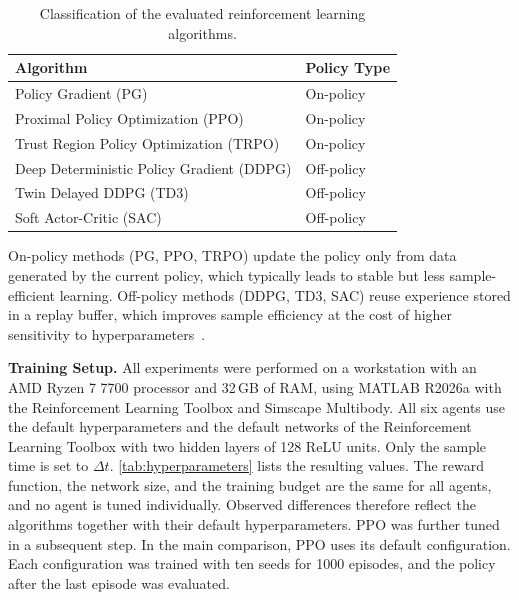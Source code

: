 \documentclass{ieeeaccess}
\begin{document}
\begin{table}[!t]
\centering
\caption{Classification of the evaluated reinforcement learning algorithms.}
\label{tab:on_off_policy}
\begin{tabular}{ll}
\toprule
\textbf{Algorithm} & \textbf{Policy Type} \\
\midrule
Policy Gradient (PG) & On-policy \\
Proximal Policy Optimization (PPO) & On-policy  \\
Trust Region Policy Optimization (TRPO) & On-policy  \\
Deep Deterministic Policy Gradient (DDPG) & Off-policy  \\
Twin Delayed DDPG (TD3) & Off-policy  \\
Soft Actor-Critic (SAC) & Off-policy  \\
\bottomrule
\end{tabular}
\end{table}
On-policy methods (PG, PPO, TRPO) update the policy only from data generated by the
current policy, which typically leads to stable but less sample-efficient learning. Off-policy methods (DDPG,
TD3, SAC) reuse experience stored in a replay buffer, which improves sample efficiency at
the cost of higher sensitivity to hyperparameters~\cite{b2,b7}.

\textbf{Training Setup.} All experiments were performed on a workstation with an AMD Ryzen 7 7700
processor and 32\,GB of RAM, using MATLAB R2026a with the Reinforcement Learning Toolbox and
Simscape Multibody. All six agents use the default hyperparameters and the default networks of the
Reinforcement Learning Toolbox with two hidden layers of 128 ReLU units. Only the sample time is set to
$\Delta t$. \cref{tab:hyperparameters} lists the resulting values. The reward function, the
network size, and the training budget are the same for all agents, and no agent is tuned individually.
Observed differences therefore reflect the algorithms together with their default hyperparameters. PPO
was further tuned in a subsequent step. In the main comparison, PPO uses its default configuration. Each
configuration was trained with ten seeds for 1000 episodes, and the policy after the last episode was
evaluated.
\end{document}
